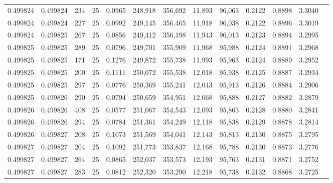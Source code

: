 \begin{tabular}{rrrrrrrrrrrrr}
0.499824 & 0.499824 &   234 &  25 &                                     0.0965 & 248,918 & 356,692 &  11,893 &  96,063 & 0.2122 & 0.8898 & 3.3040 \\
0.499824 & 0.499824 &   227 &  25 &                                     0.0992 & 249,145 & 356,465 &  11,918 &  96,038 & 0.2122 & 0.8896 & 3.3019 \\
0.499824 & 0.499825 &   267 &  25 &                                     0.0856 & 249,412 & 356,198 &  11,943 &  96,013 & 0.2123 & 0.8894 & 3.2995 \\
0.499825 & 0.499825 &   289 &  25 &                                     0.0796 & 249,701 & 355,909 &  11,968 &  95,988 & 0.2124 & 0.8891 & 3.2968 \\
0.499825 & 0.499825 &   171 &  25 &                                     0.1276 & 249,872 & 355,738 &  11,993 &  95,963 & 0.2124 & 0.8889 & 3.2952 \\
0.499825 & 0.499825 &   200 &  25 &                                     0.1111 & 250,072 & 355,538 &  12,018 &  95,938 & 0.2125 & 0.8887 & 3.2934 \\
0.499825 & 0.499825 &   297 &  25 &                                     0.0776 & 250,369 & 355,241 &  12,043 &  95,913 & 0.2126 & 0.8884 & 3.2906 \\
0.499825 & 0.499826 &   290 &  25 &                                     0.0794 & 250,659 & 354,951 &  12,068 &  95,888 & 0.2127 & 0.8882 & 3.2879 \\
0.499826 & 0.499826 &   408 &  25 &                                     0.0577 & 251,067 & 354,543 &  12,093 &  95,863 & 0.2128 & 0.8880 & 3.2841 \\
0.499826 & 0.499826 &   294 &  25 &                                     0.0784 & 251,361 & 354,249 &  12,118 &  95,838 & 0.2129 & 0.8878 & 3.2814 \\
0.499826 & 0.499827 &   208 &  25 &                                     0.1073 & 251,569 & 354,041 &  12,143 &  95,813 & 0.2130 & 0.8875 & 3.2795 \\
0.499827 & 0.499827 &   204 &  25 &                                     0.1092 & 251,773 & 353,837 &  12,168 &  95,788 & 0.2130 & 0.8873 & 3.2776 \\
0.499827 & 0.499827 &   264 &  25 &                                     0.0865 & 252,037 & 353,573 &  12,193 &  95,763 & 0.2131 & 0.8871 & 3.2752 \\
0.499827 & 0.499827 &   283 &  25 &                                     0.0812 & 252,320 & 353,290 &  12,218 &  95,738 & 0.2132 & 0.8868 & 3.2725 \\

\end{tabular}
